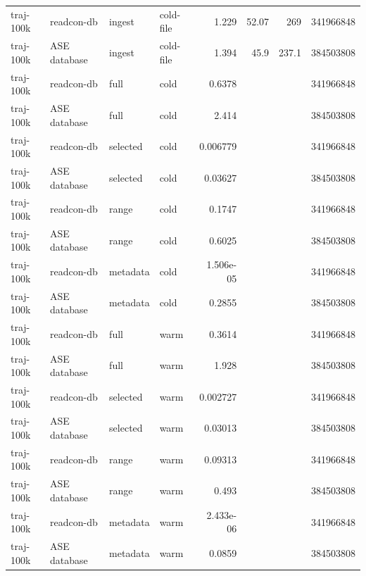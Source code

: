 {\begin{longtable}{@{}llllrrrr@{}}
traj-100k & readcon-db & ingest & cold-file & 1.229 & 52.07 & 269 & 341966848 \\
traj-100k & ASE database & ingest & cold-file & 1.394 & 45.9 & 237.1 & 384503808 \\
traj-100k & readcon-db & full & cold & 0.6378 &  &  & 341966848 \\
traj-100k & ASE database & full & cold & 2.414 &  &  & 384503808 \\
traj-100k & readcon-db & selected & cold & 0.006779 &  &  & 341966848 \\
traj-100k & ASE database & selected & cold & 0.03627 &  &  & 384503808 \\
traj-100k & readcon-db & range & cold & 0.1747 &  &  & 341966848 \\
traj-100k & ASE database & range & cold & 0.6025 &  &  & 384503808 \\
traj-100k & readcon-db & metadata & cold & 1.506e-05 &  &  & 341966848 \\
traj-100k & ASE database & metadata & cold & 0.2855 &  &  & 384503808 \\
traj-100k & readcon-db & full & warm & 0.3614 &  &  & 341966848 \\
traj-100k & ASE database & full & warm & 1.928 &  &  & 384503808 \\
traj-100k & readcon-db & selected & warm & 0.002727 &  &  & 341966848 \\
traj-100k & ASE database & selected & warm & 0.03013 &  &  & 384503808 \\
traj-100k & readcon-db & range & warm & 0.09313 &  &  & 341966848 \\
traj-100k & ASE database & range & warm & 0.493 &  &  & 384503808 \\
traj-100k & readcon-db & metadata & warm & 2.433e-06 &  &  & 341966848 \\
traj-100k & ASE database & metadata & warm & 0.0859 &  &  & 384503808 \\
\bottomrule
\end{longtable}
}
